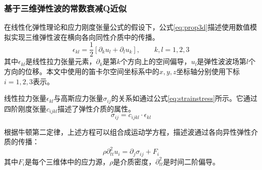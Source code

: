 \subsubsection{基于三维弹性波的常数衰减Q近似}

在线性化弹性理论和应力刚度张量公式的假设下\cite{landau1986theory}，公式\ref{eq:prop3d}描述使用数值模拟实现三维弹性波在横向各向同性介质中的传播。
\begin{equation}
  \epsilon_{kl} = \frac{1}{2}\left[ \partial_k u_l + \partial_l u_k\right], \quad\quad k,l = 1,2,3
  \label{eq:prop3d}
\end{equation}
其中$\epsilon_{kl}$是线性拉力张量元素，$\partial_k$是第$k$个方向上的空间偏导，$u_l$是弹性波波场第$l$个方向的位移。本文中使用的笛卡尔空间坐标系中的$x, y, z$坐标轴分别使用下标$i=1, 2, 3$表示。

线性拉力张量$\epsilon_{kl}$与高斯应力张量$\sigma_{ij}$的关系如通过公式\ref{eq:strainstress}所示。它通过四阶刚度张量$c_{ijkl}$描述了弹性介质的属性。
\begin{equation}
  \sigma_{ij} = c_{ijkl}\cdot \epsilon_{kl}
  \label{eq:strainstress}
\end{equation}

根据牛顿第二定律，上述方程可以组合成运动学方程，描述波通过各向异性弹性介质的传播：
\begin{equation}
  \rho \partial_{tt}^2u_i=\partial_j \sigma_{ij}+F_i
  \label{eq:partialtt}
\end{equation}
其中$F_i$是每个三维体中的应力源，$\rho$是介质密度，$\partial_{tt}^2$是时间二阶偏导。

